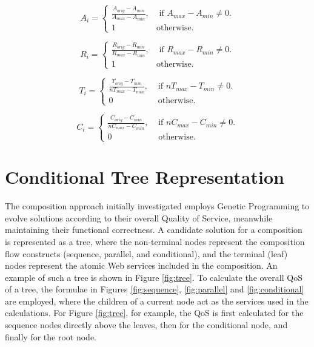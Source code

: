 \begin{equation}
A_i = \begin{cases}
     \frac{A_{orig} - A_{min}}{A_{max} - A_{min}}, & \text{ if }A_{max} - A_{min} \neq 0.\\
     1 & \mathrm{ otherwise}.
    \end{cases}
 \label{availNormalise}
\end{equation}

\begin{equation}
R_i = \begin{cases}
     \frac{R_{orig} - R_{min}}{R_{max} - R_{min}}, & \text{ if }R_{max} - R_{min} \neq 0.\\
     1 & \mathrm{ otherwise}.
    \end{cases}
 \label{reliaNormalise}
\end{equation}

\begin{equation}
T_i = \begin{cases}
     \frac{T_{orig} - T_{min}}{nT_{max} - T_{min}}, & \text{ if }nT_{max} - T_{min} \neq 0.\\
     0 & \text{ otherwise}.
    \end{cases}
 \label{timeNormalise}
\end{equation}

\begin{equation}
C_i = \begin{cases}
     \frac{C_{orig} - C_{min}}{nC_{max} - C_{min}}, & \text{ if }nC_{max} - C_{min} \neq 0.\\
     0 & \text{ otherwise}.
    \end{cases}
 \label{costNormalise}
\end{equation}

\section{Conditional Tree Representation}

The composition approach initially investigated employs Genetic Programming to evolve solutions according to their overall Quality of Service, meanwhile maintaining their functional correctness. A candidate solution for a composition is represented as a tree, where the non-terminal nodes represent the composition flow constructs (sequence, parallel, and conditional), and the terminal (leaf) nodes represent the atomic Web services included in the composition. An example of such a tree is shown in Figure \ref{fig:tree}. To calculate the overall QoS of a tree, the formulae in Figures \ref{fig:sequence}, \ref{fig:parallel} and \ref{fig:conditional} are employed, where the children of a current node act as the services used in the calculations. For Figure \ref{fig:tree}, for example, the QoS is first calculated for the sequence nodes directly above the leaves, then for the conditional node, and finally for the root node.

